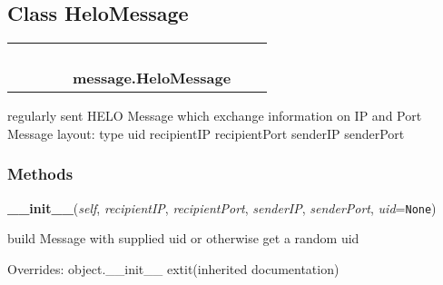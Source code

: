 
\subsection{Class HeloMessage}

    \label{message:HeloMessage}
\begin{tabular}{cccccccc}
\multicolumn{2}{r}{\settowidth{\BCL}{object}\multirow{2}{\BCL}{object}}
&&
&&
  \\\cline{3-3}
  &&\multicolumn{1}{c|}{}
&&
&&
  \\
\multicolumn{4}{r}{\settowidth{\BCL}{message.Message}\multirow{2}{\BCL}{message.Message}}
&&
  \\\cline{5-5}
  &&&&\multicolumn{1}{c|}{}
&&
  \\
&&&&\multicolumn{2}{l}{\textbf{message.HeloMessage}}
\end{tabular}

regularly sent HELO Message which exchange information on IP and Port 
Message layout: {\textbar} type {\textbar} uid {\textbar} recipientIP 
{\textbar} recipientPort {\textbar} senderIP {\textbar} senderPort 
{\textbar}



  \subsubsection{Methods}

    \vspace{0.5ex}

\hspace{.8\funcindent}\begin{boxedminipage}{\funcwidth}

    \raggedright \textbf{\_\_init\_\_}(\textit{self}, \textit{recipientIP}, \textit{recipientPort}, \textit{senderIP}, \textit{senderPort}, \textit{uid}={\tt None})

\setlength{\parskip}{2ex}
    build Message with supplied uid or otherwise get a random uid

\setlength{\parskip}{1ex}
      Overrides: object.\_\_init\_\_ 	extit{(inherited documentation)}

    \end{boxedminipage}

